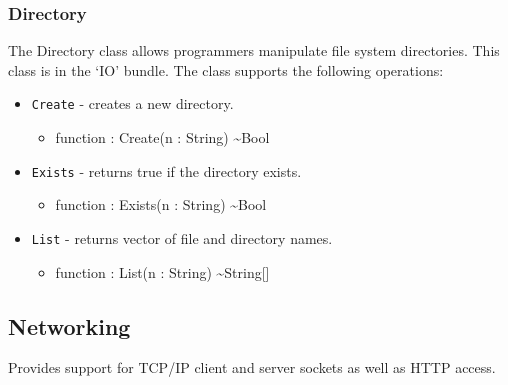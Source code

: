 \documentclass[11pt]{article}
\begin{document}
\subsubsection{Directory}
The Directory class allows programmers manipulate file system
directories.  This class is in the `IO' bundle.  The class supports
the following operations:
\begin{itemize}
\item \texttt{Create} - creates a new directory.
  \begin{itemize}
  \item function : Create(n : String) \textasciitilde Bool
  \end{itemize}
\item \texttt{Exists} - returns true if the directory exists.
  \begin{itemize}
  \item function : Exists(n : String) \textasciitilde Bool
  \end{itemize}
\item \texttt{List} - returns vector of file and directory names.
  \begin{itemize}
  \item function : List(n : String) \textasciitilde String[]
  \end{itemize}
\end{itemize}

\subsection{Networking}
Provides support for TCP/IP client and server sockets as well as HTTP access.
\end{document}
